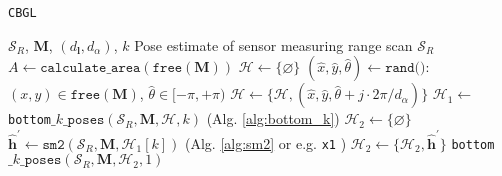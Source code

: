 \begin{algorithm}[]
  \caption{\texttt{CBGL}}
  \begin{spacing}{1.0}
  \begin{algorithmic}[1]
    \REQUIRE $\mathcal{S}_R$, $\bm{M}$, $(d_{\bm{l}}, d_\alpha)$, $k$
    \ENSURE Pose estimate of sensor measuring range scan $\mathcal{S}_R$ %
    \STATE $A \leftarrow \texttt{calculate\_area}(\texttt{free}(\bm{M}))$
    \STATE $\mathcal{H} \leftarrow \{\varnothing\}$
      \STATE \small $(\hat{x},\hat{y},\hat{\theta}) \leftarrow \texttt{rand()}$: $(x,y) \in \texttt{free}(\bm{M})$, $\hat{\theta} \in [-\pi,+\pi)$
        \STATE $\mathcal{H} \leftarrow \{\mathcal{H}, (\hat{x}, \hat{y}, \hat{\theta} + j \cdot 2\pi / d_{\alpha})\}$     \label{alg:cbgl:h}
      \ENDFOR
    \ENDFOR
    \STATE $\mathcal{H}_1 \leftarrow$ \texttt{bottom}$\_k\_\texttt{poses}(\mathcal{S}_R, \bm{M}, \mathcal{H}, k)$ \hfill {\small (Alg. \ref{alg:bottom_k}}) \label{alg:cbgl:h1}
    \STATE $\mathcal{H}_2 \leftarrow \{\varnothing \}$
      \STATE $\hat{\bm{h}}^\prime \leftarrow \texttt{sm2}(\mathcal{S}_R, \bm{M}, \mathcal{H}_1[k])$ \hfill {\small (Alg. \ref{alg:sm2} or e.g. \texttt{x1} \cite{Filotheou2023a}})
      \STATE $\mathcal{H}_2 \leftarrow \{\mathcal{H}_2, \hat{\bm{h}}^\prime\}$  \label{alg:cbgl:h2}
    \ENDFOR
    \RETURN \texttt{bottom}$\_k\_\texttt{poses}(\mathcal{S}_R, \bm{M}, \mathcal{H}_2, 1)$
  \end{algorithmic}
  \end{spacing}
  \label{alg:cbgl}
\end{algorithm}

